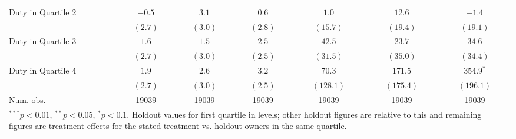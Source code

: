 \documentclass[12pt]{article}
\begin{document}
\begin{center}
\begin{longtable}{l c c c c c c }
Duty in Quartile 2         & $-0.5$        & $3.1$         & $0.6$        & $1.0$         & $12.6$         & $-1.4$         \\
                           & $(2.7)$       & $(3.0)$       & $(2.8)$      & $(15.7)$      & $(19.4)$       & $(19.1)$       \\
Duty in Quartile 3         & $1.6$         & $1.5$         & $2.5$        & $42.5$        & $23.7$         & $34.6$         \\
                           & $(2.7)$       & $(3.0)$       & $(2.5)$      & $(31.5)$      & $(35.0)$       & $(34.4)$       \\
Duty in Quartile 4         & $1.9$         & $2.6$         & $3.2$        & $70.3$        & $171.5$        & $354.9^{*}$    \\
                           & $(2.7)$       & $(3.0)$       & $(2.5)$      & $(128.1)$     & $(175.4)$      & $(196.1)$      \\
\hline
Num. obs.                  & 19039         & 19039         & 19039        & 19039         & 19039          & 19039          \\
\hline
\multicolumn{7}{l}{\scriptsize{\parbox{.75\linewidth}{$^{***}p<0.01$, $^{**}p<0.05$, $^*p<0.1$. Holdout values for first quartile in levels; other holdout figures are relative to this and remaining figures are treatment effects for the stated treatment vs. holdout owners in the same quartile.}}}\\
\end{longtable}
\end{center}
\end{document}

